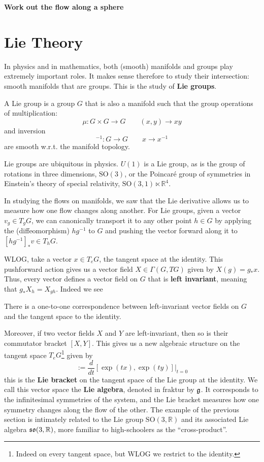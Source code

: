 	\textbf{Work out the flow along a sphere}
	
	
	\section{Lie Theory} %
	\label{sec:lie_theory}
		
		In physics and in mathematics, both (smooth) manifolds and groups play extremely important roles. It makes sense therefore to study their intersection: smooth manifolds that are groups. This is the study of \textbf{Lie groups}.
		\begin{defn}
			A Lie group is a group $G$ that is also a manifold such that the group operations of multiplication:
			$$\mu: G \times G \to G \qquad (x, y) \to xy$$
			and inversion 
			$$^{-1} : G \to G \qquad x \to x^{-1}$$
			are smooth w.r.t. the manifold topology.
		\end{defn}
		
		Lie groups are ubiquitous in physics. $U(1)$ is a Lie group, as is the group of rotations in three dimensions, $\mathrm{SO}(3)$, or the Poincar\'e group of symmetries in Einstein's theory of special relativity, $\mathrm{SO}(3, 1) \ltimes \mathbb R^4$.
		
		In studying the flows on manifolds, we saw that the Lie derivative allows us to measure how one flow changes along another. For Lie groups, given a vector $v_g \in T_g G$, we can canonically transport it to any other point $h \in G$ by applying the (diffeomorphism) $h g^{-1}$ to $G$ and pushing the vector forward along it to $[h g^{-1}]_* v \in T_{h} G$.
		
		WLOG, take a vector $x \in T_e G$, the tangent space at the identity. This pushforward action gives us a vector field $X \in \Gamma(G, TG)$ given by $X(g) = g_* x$. Thus, every vector defines a vector field on $G$ that is \textbf{left invariant}, meaning that $g_* X_h = X_{gh}$. Indeed we see
		\begin{prop}
			There is a one-to-one correspondence between left-invariant vector fields on $G$ and the tangent space to the identity. 
		\end{prop}
		Moreover, if two vector fields $X$ and $Y$ are left-invariant, then so is their commutator bracket $[X, Y]$. This gives us a new algebraic structure on the tangent space $T_e G$\footnote{Indeed on every tangent space, but WLOG we restrict to the identity.} given by 
		\begin{equation}
			[x, y] := \frac{d}{dt} [\exp(tx), \exp(ty)] |_{t = 0}
		\end{equation}
		this is the \textbf{Lie bracket} on the tangent space of the Lie group at the identity. We call this vector space the \textbf{Lie algebra}, denoted in fraktur by $\frak g$. It corresponds to the infinitesimal symmetries of the system, and the Lie bracket measures how one symmetry changes along the flow of the other. The example of the previous section is intimately related to the Lie group $\mathrm{SO}(3, \mathbb R)$ and its associated Lie algebra $\frak{so}(3, \mathbb R)$, more familiar to high-schoolers as the ``cross-product''.
		
